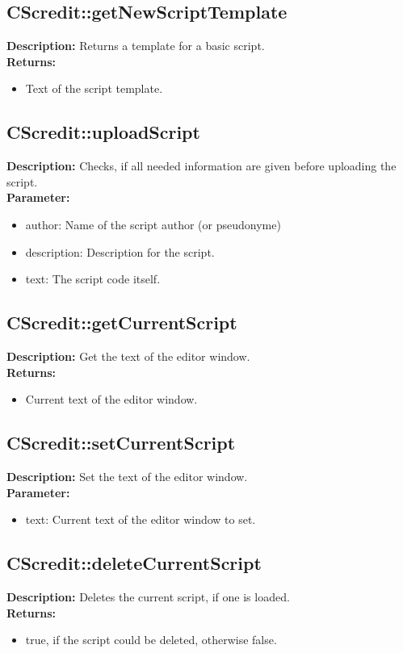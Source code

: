 \subsection{CScredit::getNewScriptTemplate}
\textbf{Description:} Returns a template for a basic script.\\
\textbf{Returns:}
\begin{itemize}
\item Text of the script template.
\end{itemize}

\subsection{CScredit::uploadScript}
\textbf{Description:} Checks, if all needed information are given before uploading the script.\\
\textbf{Parameter:}
\begin{itemize}
\item author: Name of the script author (or pseudonyme)
\item description: Description for the script.
\item text: The script code itself.
\end{itemize}

\subsection{CScredit::getCurrentScript}
\textbf{Description:} Get the text of the editor window.\\
\textbf{Returns:}
\begin{itemize}
\item Current text of the editor window.
\end{itemize}

\subsection{CScredit::setCurrentScript}
\textbf{Description:} Set the text of the editor window.\\
\textbf{Parameter:}
\begin{itemize}
\item text: Current text of the editor window to set.
\end{itemize}

\subsection{CScredit::deleteCurrentScript}
\textbf{Description:} Deletes the current script, if one is loaded.\\
\textbf{Returns:}
\begin{itemize}
\item true, if the script could be deleted, otherwise false.
\end{itemize}

